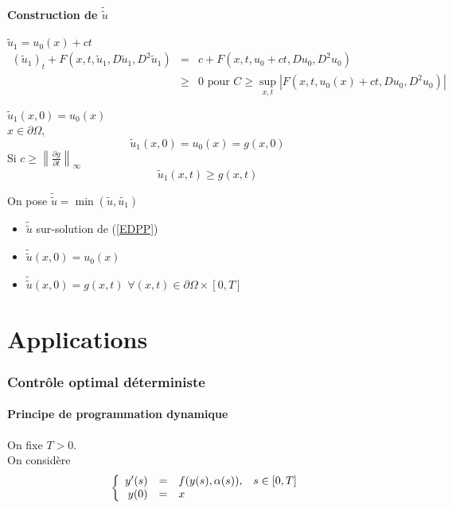
\subsection{Construction de $\tilde{\tilde{u}}$}
$\tilde{u}_1=u_0(x)+ct$
\begin{eqnarray*}
(\tilde{u}_1)_t+F(x,t,\tilde{u}_1,D\tilde{u}_1,D^2\tilde{u}_1)&=&c+F(x,t,u_0+ct,Du_0,D^2u_0)\\
			&\geq&0 \text{ pour } C\geq\sup_{x,t}|F(x,t,u_0(x)+ct,Du_0,D^2u_0)|
\end{eqnarray*}

$\tilde{u}_1(x,0)=u_0(x)$\\
$x\in\partial\Omega$, \[\tilde{u}_1(x,0)=u_0(x)=g(x,0)\]
Si $c\geq\left\| \frac{\partial g}{\partial t}\right\|_\infty$
	\[\tilde{u}_1(x,t)\geq g(x,t)\]

On pose $\tilde{\tilde{u}}=\min(\tilde{u}, \tilde{u_1})$
\begin{itemize}
	\item $\tilde{\tilde{u}}$ sur-solution de (\ref{EDPP})
	\item $\tilde{\tilde{u}}(x,0)=u_0(x)$
	\item $\tilde{\tilde{u}}(x,0)=g(x,t)$ $\forall(x,t)\in\partial\Omega\times[0,T]$
\end{itemize}

\part{Applications}
\section{Contrôle optimal déterministe}
\subsection{Principe de programmation dynamique}
On fixe $T>0$.\\
On considère
\[\left\{\begin{array}{r c l c}
	y'(s)&=&f(y(s),\alpha(s)), & s\in[0,T]\\
	y(0)&=&x
\end{array}\right.\]

